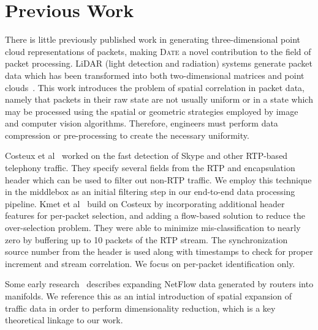\section{Previous Work}

There is little previously published work in generating three-dimensional point cloud representations of packets, making \textsc{Date} a novel contribution to the field of packet processing. LiDAR (light detection and radiation) systems generate packet data which has been transformed into both two-dimensional matrices and point clouds~\cite{Tu2019point}. This work introduces the problem of spatial correlation in packet data, namely that packets in their raw state are not usually uniform or in a state which may be processed using the spatial or geometric strategies employed by image and computer vision algorithms. Therefore, engineers must perform data compression or pre-processing to create the necessary uniformity.

Costeux et al~\cite{costeux2006detection} worked on the fast detection of Skype and other RTP-based telephony traffic. They specify several fields from the RTP and encapsulation header which can be used to filter out non-RTP traffic. We employ this technique in the middlebox as an initial filtering step in our end-to-end data processing pipeline. Kmet et al~\cite{kmetfast} build on Costeux by incorporating additional header features for per-packet selection, and adding a flow-based solution to reduce the over-selection problem. They were able to minimize mis-classification to nearly zero by buffering up to 10 packets of the RTP stream. The synchronization source number from the header is used along with timestamps to check for proper increment and stream correlation. We focus on per-packet identification only. 

Some early research~\cite{patwari2005manifold} describes expanding NetFlow data generated by routers into manifolds. We reference this as an intial introduction of spatial expansion of traffic data in order to perform dimensionality reduction, which is a key theoretical linkage to our work.
